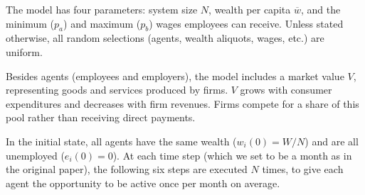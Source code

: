 The model has four parameters: system size $N$, wealth per capita $\overline{w}$, and the minimum ($p_{a}$) and maximum ($p_{b}$) wages employees can receive. Unless stated otherwise, all random selections (agents, wealth aliquots, wages, etc.) are uniform.

Besides agents (employees and employers), the model includes a market value $V$, representing goods and services produced by firms. $V$ grows with consumer expenditures and decreases with firm revenues. Firms compete for a share of this pool rather than receiving direct payments.

In the initial state, all agents have the same wealth ($w_{i}(0)={W}/N$) and are all unemployed ($e_{i}(0)=0$). At each time step (which we set to be a month as in the original paper), the following six steps are executed $N$ times, to give each agent the opportunity to be active once per month on average.
